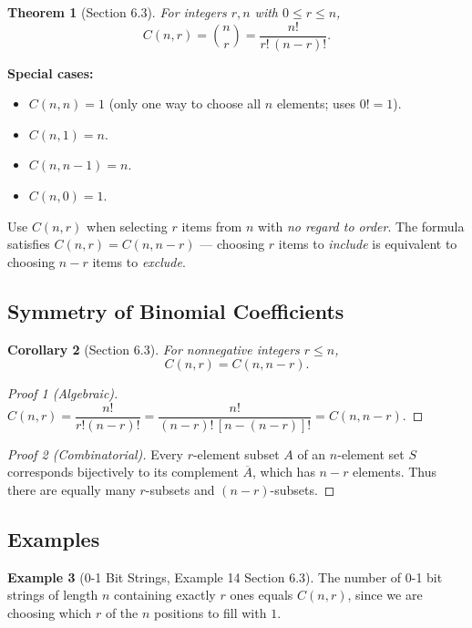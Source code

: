 \documentclass[11pt, a4paper, notitlepage]{report}
\newtheorem{theorem}{Theorem}[section]
\newtheorem{corollary}[theorem]{Corollary}
\theoremstyle{definition}
\newtheorem{example}[theorem]{Example}
\theoremstyle{remark}
\begin{document}
\begin{theorem}[Section 6.3]
\label{thm:cnr}
For integers $r, n$ with $0 \leq r \leq n$,
\[
  C(n,r) = \binom{n}{r} = \frac{n!}{r!\,(n-r)!}.
\]
\end{theorem}

\textbf{Special cases:}
\begin{itemize}
  \item $C(n,n) = 1$ (only one way to choose all $n$ elements; uses $0! = 1$).
  \item $C(n,1) = n$.
  \item $C(n, n-1) = n$.
  \item $C(n,0) = 1$.
\end{itemize}

\begin{keyresult}[title={Key Result: $C(n,r) = n!/[r!(n-r)!]$}]
Use $C(n,r)$ when selecting $r$ items from $n$ with \emph{no regard to order}.
The formula satisfies $C(n,r) = C(n, n-r)$ — choosing $r$ items to \emph{include} is equivalent
to choosing $n-r$ items to \emph{exclude}.
\end{keyresult}

\subsection{Symmetry of Binomial Coefficients}

\begin{corollary}[Section 6.3]
\label{cor:symmetry}
For nonnegative integers $r \leq n$,
\[
  C(n, r) = C(n, n-r).
\]
\end{corollary}

\begin{proof}[Proof 1 (Algebraic)]
$C(n,r) = \dfrac{n!}{r!(n-r)!} = \dfrac{n!}{(n-r)!\,[n-(n-r)]!} = C(n, n-r)$.
\end{proof}

\begin{proof}[Proof 2 (Combinatorial)]
Every $r$-element subset $A$ of an $n$-element set $S$ corresponds bijectively to its complement
$\overline{A}$, which has $n-r$ elements. Thus there are equally many $r$-subsets and
$(n-r)$-subsets.
\end{proof}

\subsection{Examples}

\begin{example}[0-1 Bit Strings, Example 14 Section 6.3]
The number of 0-1 bit strings of length $n$ containing exactly $r$ ones equals $C(n,r)$, since
we are choosing which $r$ of the $n$ positions to fill with $1$.
\end{example}
\end{document}
